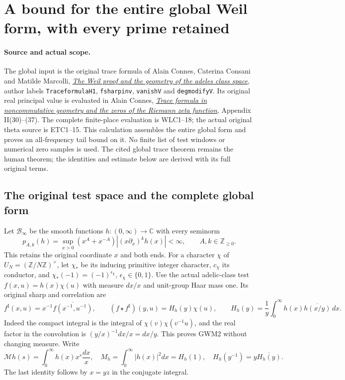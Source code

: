 \section{A bound for the entire global Weil form, with every prime retained}
\label{sec:global-weil-modulation}

\paragraph{Source and actual scope.}
The global input is the original trace formula of Alain Connes,
Caterina Consani and Matilde Marcolli,
\href{https://arxiv.org/abs/math/0703392v1}{\emph{The Weil proof and the
geometry of the adeles class space}}, author labels
\texttt{TraceformulaH1}, \texttt{fsharpinv}, \texttt{vanishV} and
\texttt{degmodifyV}. Its original real principal value is evaluated
in Alain Connes,
\href{https://arxiv.org/abs/math/9811068v1}{\emph{Trace formula in
noncommutative geometry and the zeros of the Riemann zeta function}},
Appendix II(30)--(37). The complete finite-place evaluation is WLC1--18;
the actual original theta source is ETC1--15. This calculation assembles
the entire global form and proves an all-frequency tail bound on it.
No finite list of test windows or numerical zero samples is used.
The cited global trace theorem remains the human theorem; the
identities and estimate below are derived with its full original terms.

\subsection{The original test space and the complete global form}

Let $\mathcal B_\infty$ be the smooth functions $h:(0,\infty)\to\mathbb C$
with every seminorm
\begin{equation}\tag{GWM1}
 p_{A,k}(h)=\sup_{x>0}(x^A+x^{-A})|(x\partial_x)^k h(x)|<\infty,
 \qquad A,k\in\mathbb Z_{\ge0}.
\end{equation}
This retains the original coordinate $x$ and both ends. For a character
$\chi$ of $U_N=(\mathbb Z/N\mathbb Z)^\times$, let $\chi_*$ be its
inducing primitive integer character, $c_\chi$ its conductor, and
$\chi_*(-1)=(-1)^{\epsilon_\chi}$, $\epsilon_\chi\in\{0,1\}$.
Use the actual adelic-class test $f(x,u)=h(x)\chi(u)$ with measure
$dx/x$ and unit-group Haar mass one. Its original sharp and correlation are
\begin{equation}\tag{GWM2}
 f^\sharp(x,u)=x^{-1}\overline{f(x^{-1},u^{-1})},\qquad
 (f\star f^\sharp)(y,u)=H_h(y)\chi(u),\qquad
 H_h(y)=\frac1y\int_0^\infty h(x)\overline{h(x/y)}\,dx.
\end{equation}
Indeed the compact integral is the integral of
$\chi(v)\chi(v^{-1}u)$, and the real factor in the convolution is
$(y/x)^{-1}dx/x=dx/y$. This proves GWM2 without changing measure.
Write
\begin{equation}\tag{GWM3}
 \mathcal M h(s)=\int_0^\infty h(x)x^s\frac{dx}{x},\quad
 M_h=\int_0^\infty|h(x)|^2dx=H_h(1),\quad
 H_h(y^{-1})=y\overline{H_h(y)}.
\end{equation}
The last identity follows by $x=yz$ in the conjugate integral.

